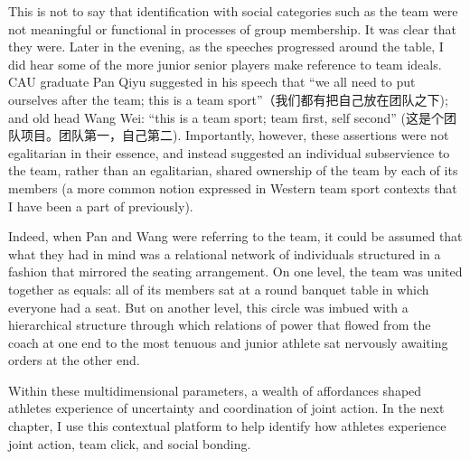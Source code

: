 \begin{CJK}{UTF8}{gbsn}
This is not to say that identification with social categories such as the team were not meaningful or functional in processes of group membership. It was clear that they were.  Later in the evening, as the speeches progressed around the table, I did hear some of the more junior senior players make reference to team ideals.  CAU graduate Pan Qiyu suggested in his speech that ``we all need to put ourselves after the team; this is a team sport''（我们都有把自己放在团队之下); and old head Wang Wei: ``this is a team sport; team first, self second'' (这是个团队项目。团队第一，自己第二).  Importantly, however, these assertions were not egalitarian in their essence, and instead suggested an individual subservience to the team, rather than an egalitarian, shared ownership of the team by each of its members (a more common notion expressed in Western team sport contexts that I have been a part of previously).

Indeed, when Pan and Wang were referring to the team, it could be assumed that what they had in mind was a relational network of individuals structured in a fashion that mirrored the seating arrangement. On one level, the team was united together as equals: all of its members sat at a round banquet table in which everyone had a seat. But on another level, this circle was imbued with a hierarchical structure through which relations of power that flowed from the coach at one end to the most tenuous and junior athlete sat nervously awaiting orders at the other end.

Within these multidimensional parameters, a wealth of affordances shaped athletes experience of uncertainty and coordination of joint action.  In the next chapter, I use this contextual platform to help identify how athletes experience joint action, team click, and social bonding.














            \end{CJK}

